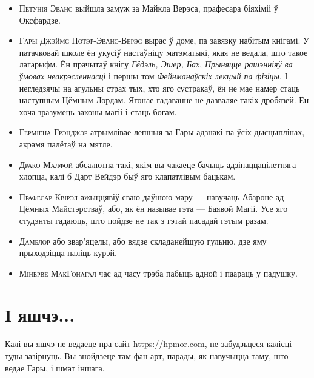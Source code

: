 \begin{itemize}
\item \textsc{Петунія Эванс} 
выйшла замуж за Майкла Верэса, прафесара біяхіміі ў Оксфардзе.
\item \textsc{Гары Джэймс Потэр-Эванс-Верэс}
вырас ў доме, па завязку набітым кнігамі. У патачковай школе ён укусіў настаўніцу матэматыкі,
якая не ведала, што такое лагарыфм. Ён прачытаў кнігу \emph{Гёдэль, Эшер, Бах},
\emph{Прыняцце рашэнніяў ва ўмовах неакрэсленнасці} і першы том 
\emph{Фейнманаўскіх лекцый па фізіцы}. І негледзячы на агульны страх тых, хто 
яго сустракаў, ён не мае намер стаць наступным Цёмным Лордам. 
Ягонае гадаванне не дазваляе такіх дробязей. Ён хоча зразумець законы магіі і стаць
богам. 
\item \textsc{Герміёна Грэнджэр} атрымлівае лепшыя за Гары адзнакі па ўсіх дысцыплінах,
акрамя палётаў на мятле.
\item \textsc{Драко Малфой} абсалютна такі, якім вы чакаеце бачыць адзінаццацілетняга
хлопца, калі б Дарт Вейдэр быў яго клапатлівым бацькам. 
\item \textsc{Прафесар Квірэл} ажыццявіў сваю даўнюю мару --- навучаць 
Абароне ад Цёмных Майстэрстваў, або, як ён называе гэта --- Баявой Магіі. 
Усе яго студэнты гадаюць, што пойдзе не так з гэтай пасадай гэтым разам.
\item \textsc{Дамблор} або звар'яцелы, або вядзе складанейшую гульню, дзе
яму прыходзіцца паліць курэй. 
\item \textsc{Мінерве МакГонагал} час ад часу трэба пабыць адной і паараць у падушку.
\end{itemize}

%
%

\section*{І яшчэ...}
 
Калі вы яшчэ не ведаеце пра сайт \url{https://hpmor.com}, не забудзьцеся 
калісці туды зазірнуць. Вы знойдзеце там фан-арт, парады, як навучыцца таму, што
ведае Гары, і шмат іншага.



